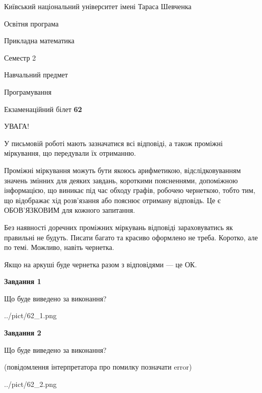 \documentclass[12pt, ukrainian]{article}
\begin{document}
{{\begin {small}\par
{ \center  Київський національний університет імені Тараса Шевченка \par}
{\parbox {5 cm}{Освітня програма \hfill}{\parbox {7 cm}{Прикладна математика\hfill}}\parbox {6 cm}{\hfill Семестр 2}}\par
{\parbox {5 cm} {Навчальний предмет \hfill}\parbox {7 cm}{Програмування \hfill}\parbox {6cm}{\hfill}\par}\vspace{-7pt} \end{small}}{\center Екзаменаційний білет \No \textbf
{ 62 }\par}}
{
\begin {large}
УВАГА!

У письмовій роботі мають зазначатися всі відповіді, а також проміжні міркування, що передували їх отриманню.

Проміжні міркування можуть бути якоюсь арифметикою, відслідковуванням зна\-чень змінних для деяких завдань,
короткими поясненнями, допоміжною інформацією, що виникає під час обходу графів, робочею чернеткою,
тобто тим, що відображає хід розв’язання або пояснює отриману відповідь.
Це є ОБОВ’ЯЗКОВИМ для кожного запитання.

Без наявності доречних проміжних міркувань відповіді зараховуватись як правиль\-ні не будуть.
Писати багато та красиво оформлено не треба. Коротко, але по темі. Можли\-во, навіть чернетка.

Якщо на аркуші буде чернетка разом з відповідями --- це ОК.

\newpage

{\begin {center}\textbf{Завдання 1}\end {center}}\par
Що буде виведено за виконання?\par
\begin{center}
	{../pict/62_1.png}
\end{center}
\newpage

{\begin {center}\textbf{Завдання 2}\end {center}}\par
Що буде виведено за виконання?\par
 (повідомлення інтерпретатора про помилку позначати error)\par
\begin{center}
	{../pict/62_2.png}
\end{center}
\newpage


\end{large}}
\end{document}

